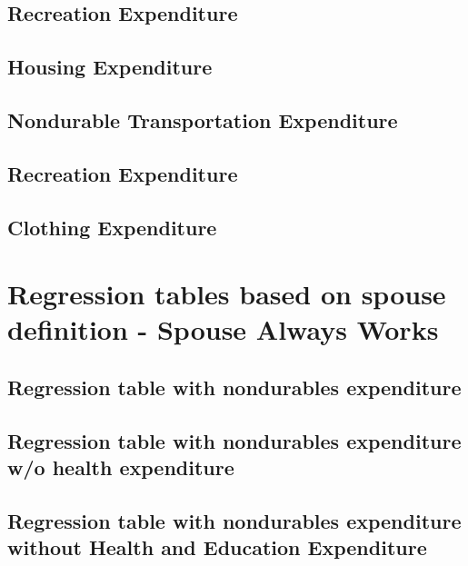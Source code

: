 \documentclass[a4paper,landscape]{article}
\begin{document}
\subsection{Recreation Expenditure}

\clearpage

\subsection{Housing Expenditure}

\clearpage

\subsection{Nondurable Transportation Expenditure}

\clearpage

\subsection{Recreation Expenditure}

\clearpage

\subsection{Clothing Expenditure}

\clearpage


\section{Regression tables based on spouse definition - Spouse Always Works}

\subsection{Regression table with nondurables expenditure}

\clearpage

\subsection{Regression table with nondurables expenditure w/o health expenditure} 

\clearpage

\subsection{Regression table with nondurables expenditure without Health and Education Expenditure}

\clearpage
\end{document}

